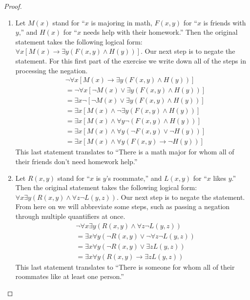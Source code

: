 \documentclass[12pt]{amsart}
\theoremstyle{definition}
\theoremstyle{remark}
\begin{document}
\begin{proof}
\hfill
\begin{enumerate}
	\item Let $M(x)$ stand for ``$x$ is majoring in math, $F(x, y)$ for ``$x$ is friends with $y$,''
	and $H(x)$ for ``$x$ needs help with their homework.''
	Then the original statement takes the following logical form:
	$\forall x [M(x) \rightarrow \exists y (F(x, y) \wedge H(y))]$.
	Our next step is to negate the statement.
	For this first part of the exercise we write down all of the steps in processing the negation.
	\begin{align*}
		& \neg \forall x [M(x) \rightarrow \exists y (F(x, y) \wedge H(y))] \\
		&= \neg \forall x [\neg M(x) \vee \exists y (F(x, y) \wedge H(y))] \\
		&= \exists x \neg [\neg M(x) \vee \exists y (F(x, y) \wedge H(y))] \\
		&= \exists x [M(x) \wedge \neg \exists y (F(x, y) \wedge H(y))] \\
		&= \exists x [M(x) \wedge \forall y \neg (F(x, y) \wedge H(y))] \\
		&= \exists x [M(x) \wedge \forall y (\neg F(x, y) \vee \neg H(y))] \\
		&= \exists x [M(x) \wedge \forall y (F(x, y) \rightarrow \neg H(y))]
	\end{align*}
	This last statement translates to ``There is a math major for whom all of their friends don't need homework help.''
	
	\item Let $R(x, y)$ stand for ``$x$ is $y$'s roommate,'' and $L(x, y)$ for ``$x$ likes $y$.''
	Then the original statement takes the following logical form:
	$\forall x \exists y (R(x, y) \wedge \forall z \neg L(y, z))$.
	Our next step is to negate the statement.
	From here on we will abbreviate some steps, such as passing a negation through multiple quantifiers at once.
	\begin{align*}
		& \neg \forall x \exists y (R(x, y) \wedge \forall z \neg L(y, z)) \\
		&= \exists x \forall y (\neg R(x, y) \vee \neg \forall z \neg L(y, z)) \\
		&= \exists x \forall y (\neg R(x, y) \vee \exists z L(y, z)) \\
		&= \exists x \forall y (R(x, y) \rightarrow \exists z L(y, z))
	\end{align*}
	This last statement translates to ``There is someone for whom all of their roommates like at least one person.''
	

\end{enumerate}
\end{proof}
\end{document}
